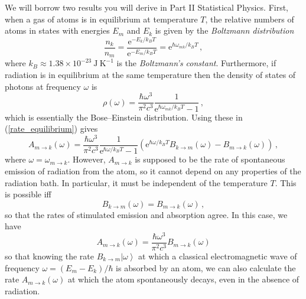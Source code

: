 \documentclass{article}
\theoremstyle{plain}\theoremheaderfont{\normalfont\itshape}\theorembodyfont{\rmfamily}\theoremseparator{.}\newtheorem*{rem}{Remark}\newtheorem*{ex}{Example}\newtheorem*{proof}{Proof}\newtheorem*{altp}{Alternative proof}
\theoremstyle{plain}\theoremheaderfont{\normalfont\bfseries}\theorembodyfont{\rmfamily}\theoremseparator{.}\newtheorem{thm}{Theorem}[section]\newtheorem{lem}[thm]{Lemma}\newtheorem{prop}[thm]{Proposition}\newtheorem*{cor}{Corollary}\newtheorem{defn}[thm]{Definition}\newtheorem{clm}[thm]{Claim}\newtheorem{clminproof}{Claim}
\theoremstyle{break}\theoremheaderfont{\normalfont\itshape}\theorembodyfont{\rmfamily}\theoremseparator{.\medskip}\newtheorem*{proofskip}{Proof}\newtheorem*{exs}{Examples}\newtheorem*{rems}{Remarks}
\theoremstyle{break}\theoremheaderfont{\normalfont\bfseries}\theorembodyfont{\rmfamily}\theoremseparator{.\medskip}\newtheorem{lemskip}[thm]{Lemma}\newtheorem{defnskip}[thm]{Definition}\newtheorem{propskip}[thm]{Proposition}\newtheorem{thmskip}[thm]{Theorem}
\numberwithin{equation}{section}
\newcommand{\unit}[1]{\ \mathrm{#1}}
\newcommand{\ee}{\mathrm{e}}
\newcommand{\ket}[1]{\left| #1 \right\rangle}
\begin{document}
    We will borrow two results you will derive in Part II Statistical Physics. First, when a gas of atoms is in equilibrium at temperature \(T\), the relative numbers of atoms in states with energies \(E_m\) and \(E_k\) is given by the \textit{Boltzmann distribution}
    \begin{equation}
        \frac{n_k}{n_m}=\frac{\ee^{-E_k/k_B T}}{\ee^{-E_m/k_B T}}=\ee^{\hbar\omega_{mk}/k_B T}\,,
    \end{equation}
    where \(k_B\approx 1.38\times 10^{-23}\unit{J}\unit{K}^{-1}\) is the \textit{Boltzmann's constant}. Furthermore, if radiation is in equilibrium at the same temperature then the density of states of photons at frequency \(\omega\) is
    \begin{equation}
        \rho(\omega)=\frac{\hbar\omega^3}{\pi^2 c^3}\frac{1}{\ee^{\hbar\omega_{mk}/k_B T}-1}\,,
    \end{equation}
    which is essentially the Bose--Einstein distribution. Using these in (\ref{rate_equilibrium}) gives
    \begin{equation}
        A_{m\to k}(\omega)=\frac{\hbar\omega^3}{\pi^2 c^3}\frac{1}{\ee^{\hbar\omega/k_B T}-1}\left(\ee^{\hbar\omega/k_B T}B_{k\to m}(\omega)-B_{m\to k}(\omega)\right)\,,
    \end{equation}
    where \(\omega=\omega_{m\to k}\). However, \(A_{m\to k}\) is supposed to be the rate of spontaneous emission of radiation from the atom, so it cannot depend on any properties of the radiation bath. In particular, it must be independent of the temperature \(T\). This is possible iff
    \begin{equation}
        B_{k\to m}(\omega)=B_{m\to k}(\omega)\,,
    \end{equation}
    so that the rates of stimulated emission and absorption agree. In this case, we have
    \begin{equation}
        A_{m\to k}(\omega)=\frac{\hbar\omega^3}{\pi^2 c^3}B_{m\to k}(\omega)
    \end{equation}
    so that knowing the rate \(B_{k\to m}\ket{\omega}\) at which a classical electromagnetic wave of frequency \(\omega=(E_m-E_k)/\hbar\) is absorbed by an atom, we can also calculate the rate \(A_{m\to k}(\omega)\) at which the atom spontaneously decays, even in the absence of radiation.
\end{document}
